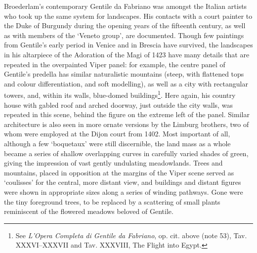 \documentclass[a4paper,12pt]{article}
\begin{document}
Broederlam's contemporary Gentile da Fabriano was amongst the Italian
artists who took up the same system for landscapes.  His contacts with
a court painter to the Duke of Burgundy during the opening years of
the fifteenth century, as well as with members of the `Veneto group',
are documented. Though few paintings from Gentile's early period in
Venice and in Brescia have survived, the landscapes in his altarpiece
of the Adoration of the Magi of 1423 have many details that are
repeated in the overpainted Viper panel: for example, the centre panel
of Gentile's predella has similar naturalistic mountains (steep, with
flattened tops and colour differentiation, and soft modelling), as
well as a city with rectangular towers, and, within its walls,
blue-domed buildings\footnote{See \textit{L'Opera Completa di Gentile
da Fabriano}, op. cit. above (note 53), Tav. XXXVI--XXXVII and
Tav. XXXVIII, The Flight into Egypt.}.  Here again, his country house
with gabled roof and arched doorway, just outside the city walls, was
repeated in this scene, behind the figure on the extreme left of the
panel. Similar architecture is also seen in more ornate versions by
the Limburg brothers, two of whom were employed at the Dijon court
from 1402. Most important of all, although a few `boquetaux' were
still discernible, the land mass as a whole became a series of shallow
overlapping curves in carefully varied shades of green, giving the
impression of vast gently undulating meadowlands. Trees and mountains,
placed in opposition at the margins of the Viper scene served as
`coulisses' for the central, more distant view, and buildings and
distant figures were shown in appropriate sizes along a series of
winding pathways. Gone were the tiny foreground trees, to be replaced
by a scattering of small plants reminiscent of the flowered meadows
beloved of Gentile.
\end{document}
